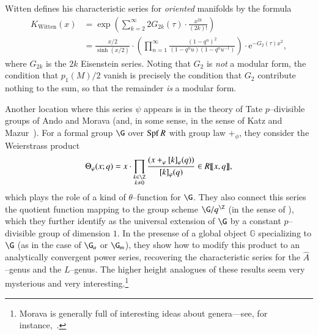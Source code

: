 \begin{remark}
Witten defines his characteristic series for \emph{oriented} manifolds by the formula
\begin{align*}
K_{\mathrm{Witten}}(x) & = \exp\left( \sum_{k=2}^\infty 2 G_{2k}(\tau) \cdot \frac{x^{2k}}{(2k)!} \right) \\
& = \frac{x/2}{\sinh(x/2)} \cdot \left(\prod_{n=1}^\infty \frac{(1 - q^n)^2}{(1 - q^n u)(1 - q^n u^{-1})}\right) \cdot \mathrm e^{-G_2(\tau) x^2},
\end{align*}
where $G_{2k}$ is the $2k${\th} Eisenstein series.  Noting that $G_2$ is \emph{not} a modular form, the condition that $p_1(M) / 2$ vanish is precisely the condition that $G_2$ contribute nothing to the sum, so that the remainder \emph{is} a modular form.
\end{remark}

\begin{remark}
Another location where this series $\psi$ appears is in the theory of Tate $p$--divisible groups of Ando and Morava (and, in some sense, in the sense of Katz and Mazur~\cite[Sections 8.7--8]{KatzMazur}).  For a formal group $\G$ over $\operatorname{Spf} R$ with group law $+_\phi$, they consider the Weierstrass product \[\Theta_{\phi}(x; q) = x \cdot \prod_{\substack{k \in \Z \\ k \ne 0}} \frac{(x +_\phi [k]_\phi(q))}{[k]_\phi(q)} \in R\ps{x,q},\] which plays the role of a kind of $\theta$--function for $\G$.  They also connect this series the quotient function mapping to the group scheme $\G / q^{\Z}$ (in the sense of ), which they further identify as the universal extension of $\G$ by a constant $p$--divisible group of dimension $1$.  In the presense of a global object $\mathbb G$ specializing to $\G$ (as in the case of $\G_a$ or $\G_m$), they show how to modify this product to an analytically convergent power series, recovering the characteristic series for the $\widehat A$--genus and the $L$--genus.  The higher height analogues of these results seem very mysterious and very interesting.\footnote{Morava is generally full of interesting ideas about genera---see, for instance,~\cite{MoravaMotivicThomIso}.}
\end{remark}

